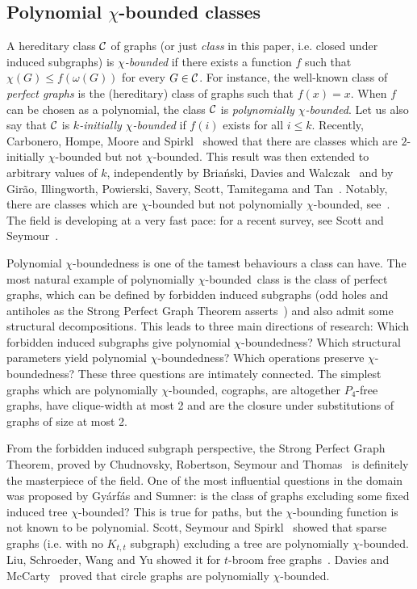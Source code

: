 \documentclass[11pt]{article}
\numberwithin{equation}{section}
\newcommand{\pcb}{polynomially $\chi$-bounded}
\begin{document}
\subsection{Polynomial $\chi$-bounded classes}
A hereditary class $\cal C$ of graphs (or just \emph{class} in this paper, i.e. closed under induced subgraphs)  is \emph{$\chi$-bounded} if there exists a function $f$ such that $\chi(G)\leq f(\omega (G))$ for every $G\in \cal C$. For instance, the well-known class of \emph{perfect graphs} is the (hereditary) class of graphs such that $f(x)=x$. When $f$ can be chosen as a polynomial, the class $\cal C$ is 
\emph{polynomially $\chi$-bounded}. Let us also say that $\cal C$ is \emph{$k$-initially $\chi$-bounded} if $f(i)$ exists for all $i\leq k$. 
Recently, Carbonero, Hompe, Moore and Spirkl~\cite{CHMS23} showed that there are classes which are $2$-initially $\chi$-bounded but not $\chi$-bounded. 
This result was then extended to arbitrary values of $k$, independently by Bria\'nski, Davies and Walczak~\cite{BDW22} and by Girão, Illingworth, Powierski, Savery, Scott, Tamitegama and Tan~\cite{GIPSSTT24}. Notably, there are classes which are $\chi$-bounded but not polynomially $\chi$-bounded, see~\cite{BDW22}. The field is developing at a very fast pace: for a recent survey, see Scott and Seymour~\cite{SS20}.

Polynomial $\chi$-boundedness is one of the tamest behaviours a class can have. The most natural example of \pcb~class is the class of perfect graphs, which can be defined by forbidden induced subgraphs (odd holes and antiholes as the Strong Perfect Graph Theorem asserts~\cite{CRST06}) and also admit some structural decompositions. This leads to three main directions of research: Which forbidden induced subgraphs give polynomial $\chi$-boundedness? 
Which structural parameters yield polynomial $\chi$-boundedness? Which operations preserve $\chi$-boundedness? These three questions are intimately connected. The simplest graphs which are \pcb, cographs, are altogether $P_4$-free graphs, have clique-width at most 2 and are the closure under substitutions of graphs of size at most 2.

From the forbidden induced subgraph perspective, the Strong Perfect Graph Theorem, proved by Chudnovsky, Robertson, Seymour
and Thomas~\cite{CRST06} is definitely the masterpiece of the field. One of the most influential questions in the domain was proposed by Gy\'arf\'as and Sumner: is the class of graphs excluding some fixed induced tree $\chi$-bounded? This is true for paths, but the $\chi$-bounding function is not known to be polynomial. Scott, Seymour and Spirkl~\cite{SSS23} showed that sparse graphs (i.e. with no $K_{t,t}$ subgraph) excluding a tree are \pcb. Liu, Schroeder, Wang and Yu showed it for $t$-broom free graphs~\cite{LSWY21}. 
Davies and McCarty~\cite{DM21} proved that circle graphs are polynomially $\chi$-bounded.
\end{document}
